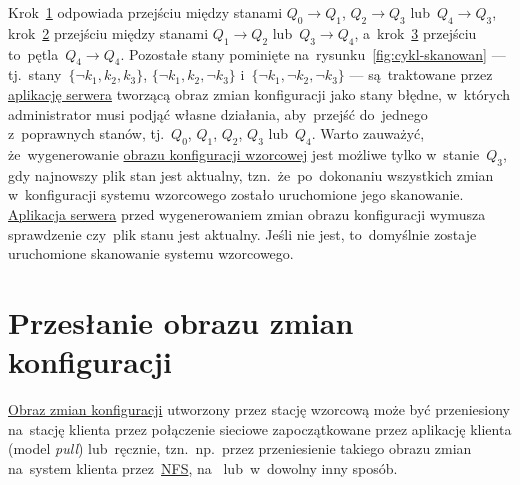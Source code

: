 \documentclass[thesis]{subfiles}
\begin{document}
Krok~\hyperlink{itm:pierwsze-skanowanie}{1} odpowiada przejściu między stanami $Q_0\rightarrow Q_1$, $Q_2\rightarrow Q_3$ lub~$Q_4\rightarrow Q_3$, krok~\hyperlink{itm:dokonanie-zmian}{2} przejściu między stanami $Q_1\rightarrow Q_2$ lub~$Q_3\rightarrow Q_4$, a~krok~\hyperlink{itm:dokonanie-zmian}{3} przejściu to~pętla~$Q_4\rightarrow Q_4$. Pozostałe stany pominięte na~rysunku~\ref{fig:cykl-skanowan} --- tj.~stany~$\{\neg k_1,k_2,k_3\}$, $\{\neg k_1,k_2,\neg k_3\}$ i~$\{\neg k_1,\neg k_2,\neg k_3\}$ --- są~traktowane przez \hyperref[sec:srv-app]{aplikację serwera} tworzącą obraz zmian konfiguracji jako stany błędne, w~których administrator musi podjąć własne działania, aby~przejść do~jednego z~poprawnych stanów, tj.~$Q_0$, $Q_1$, $Q_2$, $Q_3$ lub~$Q_4$. Warto zauważyć, że~wygenerowanie \hyperref[sec:obraz-zmian-konfiguracji]{obrazu konfiguracji wzorcowej} jest możliwe tylko w~stanie~$Q_3$, gdy najnowszy plik stan jest aktualny, tzn.~że~po~dokonaniu wszystkich zmian w~konfiguracji systemu wzorcowego zostało uruchomione jego skanowanie. \hyperref[sec:srv-app]{Aplikacja serwera} przed wygenerowaniem zmian obrazu konfiguracji wymusza sprawdzenie czy~plik stanu jest aktualny. Jeśli nie jest, to~domyślnie zostaje uruchomione skanowanie systemu wzorcowego.


\section{Przesłanie obrazu zmian konfiguracji}
\label{sec:przeslanie-obrazu-konfiguracji}

\hyperref[sec:obraz-zmian-konfiguracji]{Obraz zmian konfiguracji} utworzony przez stację wzorcową może być przeniesiony na~stację klienta przez połączenie sieciowe zapoczątkowane przez aplikację klienta (model \emph{pull}) lub~ręcznie, tzn.~np.~przez przeniesienie takiego obrazu zmian na~system klienta przez~\href{https://en.wikipedia.org/wiki/Network_File_System}{NFS}, na~ lub~w~dowolny inny sposób.
\end{document}
